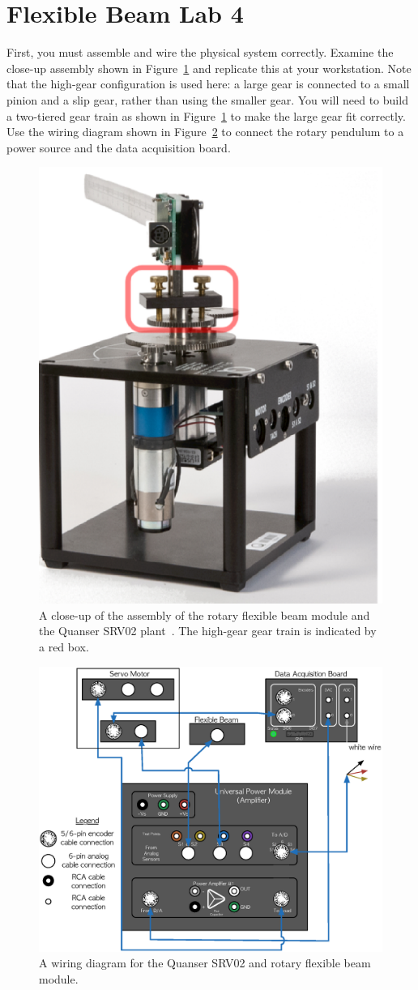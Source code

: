 \section{Flexible Beam {Lab 4}}
First, you must assemble and wire the physical system correctly. Examine the close-up assembly shown in Figure~\ref{fig:lab1_assembly} and replicate this at your workstation. Note that the high-gear configuration is used here: a large gear is connected to a small pinion and a slip gear, rather than using the smaller gear. You will need to build a two-tiered gear train as shown in Figure~\ref{fig:lab1_assembly} to make the large gear fit correctly. Use the wiring diagram shown in Figure~\ref{fig:lab1_wiring} to connect the rotary pendulum to a power source and the data acquisition board.
\begin{figure}[htb!]
    \centering
    \includegraphics[width=.3\linewidth]{eps/lab_1/assembly.eps}
    \caption{A close-up of the assembly of the rotary flexible beam module and the Quanser SRV02 plant~\cite{Q-Flex-Beam}. The high-gear gear train is indicated by a red box.}
    \label{fig:lab1_assembly}
\end{figure}
\begin{figure}[htb!]
    \centering
    \includegraphics[width=.8\linewidth]{eps/lab_1/wiring.eps}
    \caption{A wiring diagram for the Quanser SRV02 and rotary flexible beam module.}
    \label{fig:lab1_wiring}
\end{figure}


